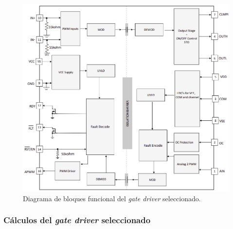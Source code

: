 \begin{figure}[H]
	\centering
	\includegraphics[width=0.7\linewidth]{fig/UCC21710-block}
	\caption{Diagrama de bloques funcional del \textit{gate driver} seleccionado.}
\end{figure}


\subsubsection{Cálculos del \textit{gate driver} seleccionado}


